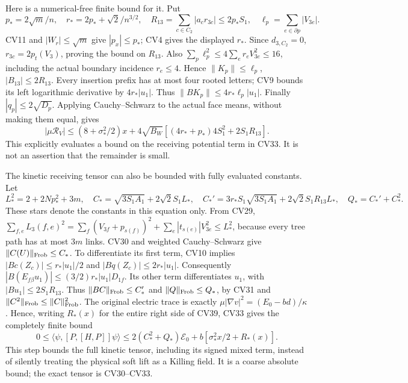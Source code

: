 \documentclass[11pt]{article}
\begin{document}
Here is a numerical-free finite bound for it. Put
\[
 p_*=2\sqrt m/n,\quad r_*=2p_*+\sqrt2/n^{3/2},\quad
 R_{13}=\sum_{c\in C_2}|a_cr_{3c}|\le2p_*S_1,\quad
 \ell_p=\sum_{e\in\partial p}|V_{3e}|.                  \tag{CV38}
\]
CV11 and \(|W_r|\le\sqrt m\) give \(|p_x|\le p_*\);
CV4 gives the displayed \(r_*\). Since \(d_{3,C_2}=0\),
\(r_{3c}=2p_t(V_3)\), proving the bound on \(R_{13}\).
Also \(\sum_p\ell_p^2\le4\sum_er_eV_{3e}^2\le16\), including
the actual boundary incidence \(r_e\le4\). Hence
\(\|K_p\|\le\ell_p\), \(|B_{13}|\le2R_{13}\).
Every insertion prefix has at most four rooted letters; CV9 bounds
its left logarithmic derivative by \(4r_*|u_1|\). Thus
\(\|BK_p\|\le4r_*\ell_p|u_1|\). Finally
\(|q_p|\le2\sqrt{D_p}\). Applying Cauchy--Schwarz to the actual
face means, without making them equal, gives
\[
 |\mu\mathcal R_V|
 \le(8+\sigma_*^2/2)x
   +4\sqrt{B_W}\left[(4r_*+p_*)4S_1^2+2S_1R_{13}\right].
                                                               \tag{CV39}
\]
This explicitly evaluates a bound on the receiving potential term
in CV33. It is not an assertion that the remainder is small.

The kinetic receiving tensor can also be bounded with fully evaluated
constants. Let
\[
 L_*^2=2+2Np_*^2+3m,\quad
 C_*=\sqrt{3S_1A_1}+2\sqrt2S_1L_*,\quad
 C_*'=3r_*S_1\sqrt{3S_1A_1}+2\sqrt2S_1R_{13}L_*,\quad
 Q_*=C_*'+C_*^2.                                      \tag{CV39a}
\]
These stars denote the constants in this equation only. From CV29,
\(\sum_{f,e}L_3(f,e)^2
=\sum_f(V_{3f}+p_{s(f)})^2+\sum_e|t_{s(e)}|V_{3e}^2
\le L_*^2\), because every tree path has at most \(3m\) links.
CV30 and weighted Cauchy--Schwarz give
\(\|C(U)\|_{\rm Frob}\le C_*\). To differentiate its first term,
CV10 implies \(|Bc(Z_c)|\le r_*|u_1|/2\) and
\(|Bq(Z_c)|\le2r_*|u_1|\). Consequently
\(|B(E_{f\beta}u_1)|\le(3/2)r_*|u_1|D_{1f}\).
Its other term differentiates \(u_1\), with
\(|Bu_1|\le2S_1R_{13}\). Thus
\(\|BC\|_{\rm Frob}\le C_*'\) and
\(\|Q\|_{\rm Frob}\le Q_*\), by CV31 and
\(\|C^2\|_{\rm Frob}\le\|C\|_{\rm Frob}^2\).
The original electric trace is exactly
\(\mu|\nabla v|^2=(E_0-bd)/\kappa\). Hence, writing \(R_*(x)\)
for the entire right side of CV39, CV33 gives the completely finite
bound
\[
 0\le\langle\psi,[P,[H,P]]\psi\rangle
 \le2(C_*^2+Q_*)\mathcal E_0
                       +b[\sigma_*^2x/2+R_*(x)].       \tag{CV39b}
\]
This step bounds the full kinetic tensor, including its signed mixed
term, instead of silently treating the physical soft lift as a Killing
field. It is a coarse absolute bound; the exact tensor is CV30–CV33.
\end{document}

